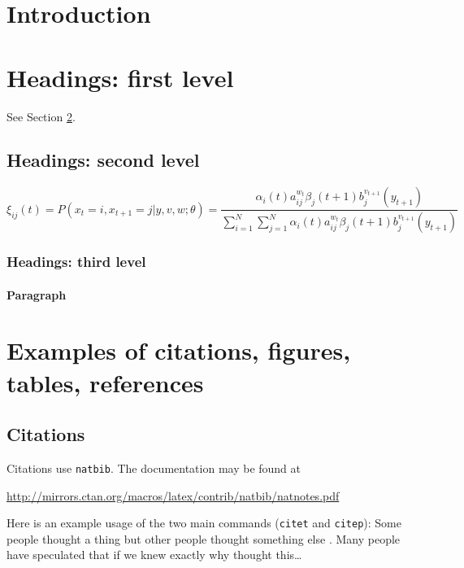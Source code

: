\documentclass{article}
\begin{document}
\section{Introduction}
\lipsum[2]
\lipsum[3]


\section{Headings: first level}
\label{sec:headings}

\lipsum[4] See Section \ref{sec:headings}.

\subsection{Headings: second level}
\lipsum[5]
\begin{equation}
	\xi _{ij}(t)=P(x_{t}=i,x_{t+1}=j|y,v,w;\theta)= {\frac {\alpha _{i}(t)a^{w_t}_{ij}\beta _{j}(t+1)b^{v_{t+1}}_{j}(y_{t+1})}{\sum _{i=1}^{N} \sum _{j=1}^{N} \alpha _{i}(t)a^{w_t}_{ij}\beta _{j}(t+1)b^{v_{t+1}}_{j}(y_{t+1})}}
\end{equation}

\subsubsection{Headings: third level}
\lipsum[6]

\paragraph{Paragraph}
\lipsum[7]



\section{Examples of citations, figures, tables, references}
\label{sec:others}

\subsection{Citations}
Citations use \verb+natbib+. The documentation may be found at
\begin{center}
	\url{http://mirrors.ctan.org/macros/latex/contrib/natbib/natnotes.pdf}
\end{center}

Here is an example usage of the two main commands (\verb+citet+ and \verb+citep+): Some people thought a thing \citep{kour2014real, hadash2018estimate} but other people thought something else \citep{kour2014fast}. Many people have speculated that if we knew exactly why \citet{kour2014fast} thought this\dots
\end{document}

